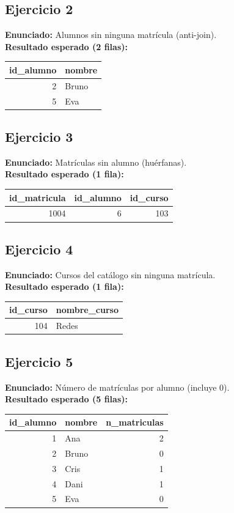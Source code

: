 \documentclass[11pt,a4paper]{article}
\begin{document}
\subsection*{Ejercicio 2}
\textbf{Enunciado:} Alumnos sin ninguna matrícula (anti-join).\\
\textbf{Resultado esperado (2 filas):}
\begin{center}
\begin{tabular}{r l}
\toprule
id\_alumno & nombre \\
\midrule
2 & Bruno \\
5 & Eva \\
\bottomrule
\end{tabular}
\end{center}

\subsection*{Ejercicio 3}
\textbf{Enunciado:} Matrículas sin alumno (huérfanas).\\
\textbf{Resultado esperado (1 fila):}
\begin{center}
\begin{tabular}{r r r}
\toprule
id\_matricula & id\_alumno & id\_curso \\
\midrule
1004 & 6 & 103 \\
\bottomrule
\end{tabular}
\end{center}

\subsection*{Ejercicio 4}
\textbf{Enunciado:} Cursos del catálogo sin ninguna matrícula.\\
\textbf{Resultado esperado (1 fila):}
\begin{center}
\begin{tabular}{r l}
\toprule
id\_curso & nombre\_curso \\
\midrule
104 & Redes \\
\bottomrule
\end{tabular}
\end{center}

\subsection*{Ejercicio 5}
\textbf{Enunciado:} Número de matrículas por alumno (incluye 0).\\
\textbf{Resultado esperado (5 filas):}
\begin{center}
\begin{tabular}{r l r}
\toprule
id\_alumno & nombre & n\_matriculas \\
\midrule
1 & Ana   & 2 \\
2 & Bruno & 0 \\
3 & Cris  & 1 \\
4 & Dani  & 1 \\
5 & Eva   & 0 \\
\bottomrule
\end{tabular}
\end{center}
\end{document}
